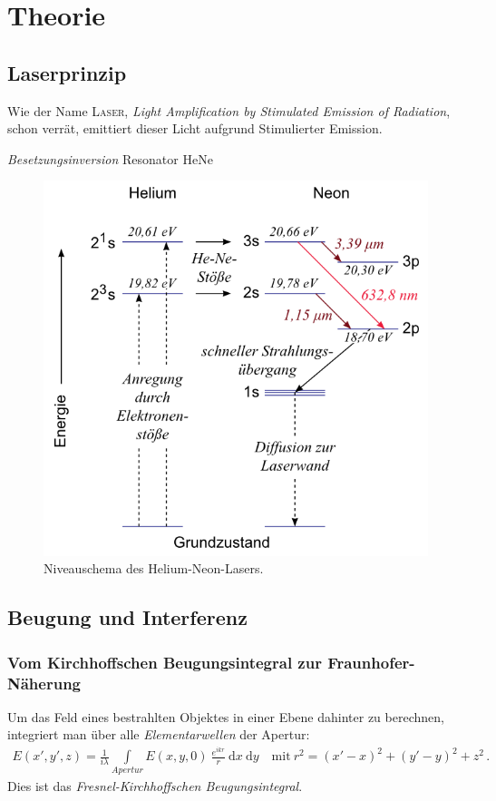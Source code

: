 \documentclass[12pt,a4paper,titlepage,headinclude,bibtotoc]{scrartcl}
\newcommand{\dif}{\ensuremath{\mathrm{d}}}
\begin{document}
\section{Theorie}
\label{sec:theorie}
\subsection{Laserprinzip}
Wie der Name \textsc{Laser}, \textit{Light Amplification by Stimulated Emission of Radiation}, schon verrät, emittiert dieser Licht aufgrund Stimulierter Emission.

\emph{Besetzungsinversion}
Resonator
HeNe

\begin{figure}[!h]
	\centering
	\includegraphics[scale=0.6]{NiveauHeNe.png}
	\caption{Niveauschema des Helium-Neon-Lasers. \cite[Datum: 02.01.15]{LP21}}
\end{figure}


\subsection{Beugung und Interferenz}

\subsubsection{Vom Kirchhoffschen Beugungsintegral zur Fraunhofer-Näherung}
Um das Feld eines bestrahlten Objektes in einer Ebene dahinter zu berechnen, integriert man über alle \emph{Elementarwellen} der Apertur:
\begin{align}
	E(x',y',z)=\frac{1}{i \lambda} \int \limits _{Apertur} E(x,y,0) ~ \frac{e^{ikr}}{r}~\dif x ~\dif y \quad \text{mit} ~ r^2=(x'-x)^2+(y'-y)^2+z^2 \,.
	\label{eq:Beugungsintegral}
\end{align}
Dies ist das \emph{Fresnel-Kirchhoffschen Beugungsintegral}.\\
\end{document}

